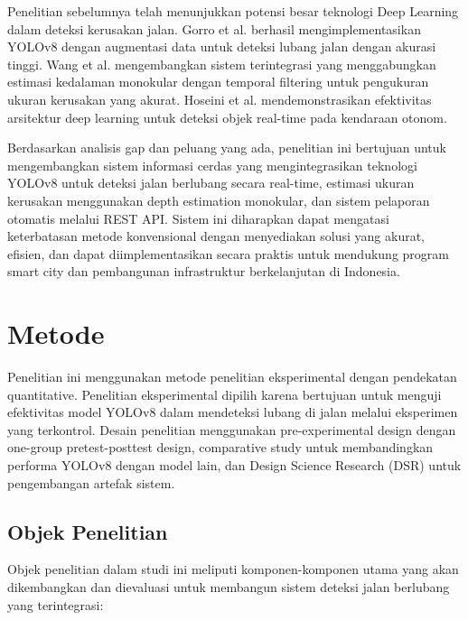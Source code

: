 \documentclass[12pt,a4paper]{article}
\begin{document}
Penelitian sebelumnya telah menunjukkan potensi besar teknologi Deep Learning dalam deteksi kerusakan jalan. Gorro et al. \cite{gorro2024} berhasil mengimplementasikan YOLOv8 dengan augmentasi data untuk deteksi lubang jalan dengan akurasi tinggi. Wang et al. \cite{wang2025} mengembangkan sistem terintegrasi yang menggabungkan estimasi kedalaman monokular dengan temporal filtering untuk pengukuran ukuran kerusakan yang akurat. Hoseini et al. \cite{hoseini2024} mendemonstrasikan efektivitas arsitektur deep learning untuk deteksi objek real-time pada kendaraan otonom.

Berdasarkan analisis gap dan peluang yang ada, penelitian ini bertujuan untuk mengembangkan sistem informasi cerdas yang mengintegrasikan teknologi YOLOv8 untuk deteksi jalan berlubang secara real-time, estimasi ukuran kerusakan menggunakan depth estimation monokular, dan sistem pelaporan otomatis melalui REST API. Sistem ini diharapkan dapat mengatasi keterbatasan metode konvensional dengan menyediakan solusi yang akurat, efisien, dan dapat diimplementasikan secara praktis untuk mendukung program smart city dan pembangunan infrastruktur berkelanjutan di Indonesia.

\section{Metode}

Penelitian ini menggunakan metode penelitian eksperimental dengan pendekatan quantitative. Penelitian eksperimental dipilih karena bertujuan untuk menguji efektivitas model YOLOv8 dalam mendeteksi lubang di jalan melalui eksperimen yang terkontrol. Desain penelitian menggunakan pre-experimental design dengan one-group pretest-posttest design, comparative study untuk membandingkan performa YOLOv8 dengan model lain, dan Design Science Research (DSR) untuk pengembangan artefak sistem.

\subsection{Objek Penelitian}

Objek penelitian dalam studi ini meliputi komponen-komponen utama yang akan dikembangkan dan dievaluasi untuk membangun sistem deteksi jalan berlubang yang terintegrasi:
\end{document}
